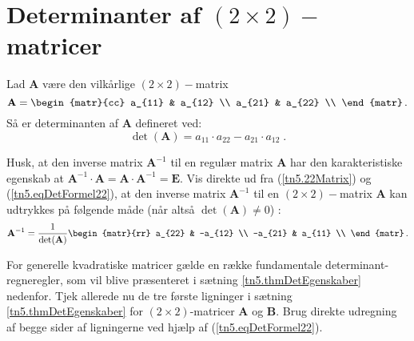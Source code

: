 \section{Determinanter af $(2 \times 2)-$matricer} \label{tn5.subsec22Matricer}

\begin{definition} \label{tn5.defDeterm22}
Lad $\mathbf{A}$ være den vilkårlige $(2 \times 2)-$matrix
\begin{equation} \label{tn5.22Matrix}
\mathbf{A} = \begin{matr}{cc}
             a_{11} & a_{12} \\
             a_{21} & a_{22} \\
\end{matr} \,  .
\end{equation}
Så er determinanten af $\mathbf{A}$ defineret ved:
\begin{equation} \label{tn5.eqDetFormel22}
\det(\mathbf{A}) = a_{11}\cdot a_{22} - a_{21}\cdot a_{12} \; .
\end{equation}
\end{definition}

\begin{exercise}
Husk, at den inverse matrix $\mathbf{A}^{-1}$ til en regulær matrix $\mathbf{A}$ har den karakteristiske egenskab at $\mathbf{A}^{-1}\cdot \mathbf{A} = \mathbf{A}\cdot \mathbf{A}^{-1} = \mathbf{E}$.
Vis direkte ud fra (\ref{tn5.22Matrix}) og (\ref{tn5.eqDetFormel22}), at den inverse matrix $\mathbf{A}^{-1}$ til en $(2 \times 2)-$matrix $\mathbf{A}$ kan udtrykkes på følgende måde (når altså $\det(\mathbf{A}) \neq 0$) :
\begin{equation}
\mathbf{A}^{-1} = \frac{1}{\det(\mathbf{A})}\begin{matr}{rr}
                                        a_{22} & -a_{12} \\
                                        -a_{21} & a_{11} \\
                                    \end{matr} \,  .
\end{equation}
\end{exercise}

\begin{exercise}
For generelle kvadratiske matricer gælde en række fundamentale determinant-regneregler, som vil blive præsenteret i sætning \ref{tn5.thmDetEgenskaber} nedenfor.
Tjek allerede nu de tre første ligninger i  sætning \ref{tn5.thmDetEgenskaber} for $(2 \times 2)$-matricer $\mathbf{A}$ og $\mathbf{B}$. Brug direkte udregning af begge sider af ligningerne ved hjælp af (\ref{tn5.eqDetFormel22}).
\end{exercise}
